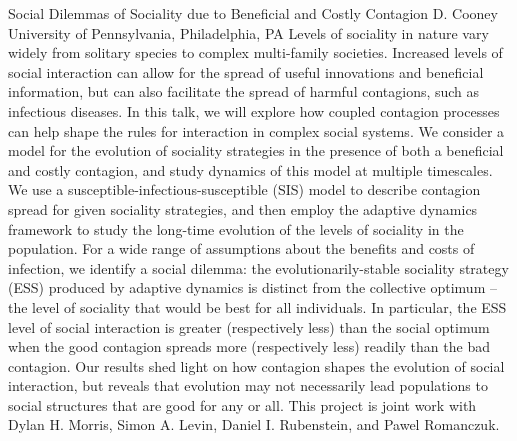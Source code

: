 
    \begin{abstract_online}{Social Dilemmas of Sociality due to Beneficial and Costly Contagion}{%
        D. Cooney}{%
        }{%
        University of Pennsylvania, Philadelphia, PA}
    Levels of sociality in nature vary widely from solitary species to complex multi-family societies. Increased levels of social interaction can allow for the spread of useful innovations and beneficial information, but can also facilitate the spread of harmful contagions, such as infectious diseases. In this talk, we will explore how coupled contagion processes can help shape the rules for interaction in complex social systems. We consider a model for the evolution of sociality strategies in the presence of both a beneficial and costly contagion, and study dynamics of this model at multiple timescales. We use a susceptible-infectious-susceptible (SIS) model to describe contagion spread for given sociality strategies, and then employ the adaptive dynamics framework to study the long-time evolution of the levels of sociality in the population. For a wide range of assumptions about the benefits and costs of infection, we identify a social dilemma: the evolutionarily-stable sociality strategy (ESS) produced by adaptive dynamics is distinct from the collective optimum -- the level of sociality that would be best for all individuals. In particular, the ESS level of social interaction is greater (respectively less) than the social optimum when the good contagion spreads more (respectively less) readily than the bad contagion. Our results shed light on how contagion shapes the evolution of social interaction, but reveals that evolution may not necessarily lead populations to social structures that are good for any or all. This project is joint work with Dylan H. Morris, Simon A. Levin, Daniel I. Rubenstein, and Pawel Romanczuk. 
    
    \end{abstract_online}
    